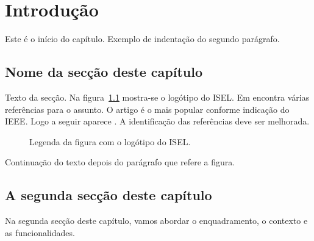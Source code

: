%
%
\chapter{Introdução}\label{ch:introducao}

Este é o início do capítulo.
Exemplo de indentação do segundo parágrafo.

%
%


\section{Nome da secção deste capítulo} \label{sec11}

Texto da secção. Na figura~\ref{fig:logotipo} mostra-se o logótipo do ISEL. Em \cite{wiki:bigdata2019} encontra várias referências para o assunto. O artigo \cite{6547630} é o mais popular conforme indicação do IEEE. Logo a seguir aparece \cite{6824752}. A identificação das referências deve ser melhorada.

\begin{figure}[h]
    \begin{center}
    \end{center}
    \caption{Legenda da figura com o logótipo do ISEL.}\label{fig:logotipo}
\end{figure}

Continuação do texto depois do parágrafo que refere a figura.

%
%


\section{A segunda secção deste capítulo} \label{sec12}
Na segunda secção deste capítulo, vamos abordar o enquadramento,
o contexto e as funcionalidades.

